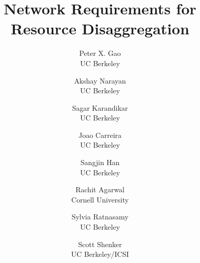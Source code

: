 \documentclass[letterpaper,twocolumn,10pt]{article}
\begin{document}
\title{\bf Network Requirements for Resource Disaggregation}

\author{
  \alignauthor Peter X. Gao\\
  UC Berkeley
\and
  \alignauthor Akshay Narayan\\
  UC Berkeley
\and
  \alignauthor Sagar Karandikar\\
  UC Berkeley
\and
  \alignauthor Joao Carreira\\
  UC Berkeley
\and
  \alignauthor Sangjin Han\\
  UC Berkeley
\and
  \alignauthor Rachit Agarwal\\
  Cornell University 
\and
  \alignauthor Sylvia Ratnasamy\\
  UC Berkeley
\and
  \alignauthor Scott Shenker\\
  UC Berkeley/ICSI
}

\date{}
\maketitle
\thispagestyle{empty}





%

%

%







\end{document}
